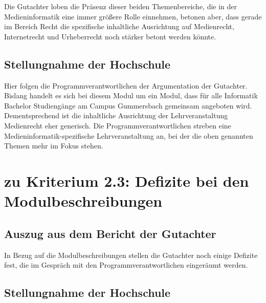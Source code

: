 \begin{siderules}
Die Gutachter loben die Präsenz dieser beiden Themenbereiche, die in der
Medieninformatik eine immer größere Rolle einnehmen, betonen aber, dass
gerade im Bereich Recht die spezifische inhaltliche Ausrichtung auf
Medienrecht, Internetrecht und Urheberrecht noch stärker betont werden
könnte.
\end{siderules}

\subsection{Stellungnahme der
Hochschule\label{/mi-2017/selbstbericht/auflagen/0000-auflagen}}\label{stellungnahme-der-hochschulepathlabelmi-2017selbstberichtauflagen0000-auflagen-1}

Hier folgen die Programmverantwortlichen der Argumentation der
Gutachter. Bislang handelt es sich bei diesem Modul um ein Modul, dass
für alle Informatik Bachelor Studiengänge am Campus Gummersbach
gemeinsam angeboten wird. Dementsprechend ist die inhaltliche
Ausrichtung der Lehrveranstaltung Medienrecht eher generisch. Die
Programmverantwortlichen streben eine Medieninformatik-spezifische
Lehrveranstaltung an, bei der die oben genannten Themen mehr im Fokus
stehen.

\section{zu Kriterium 2.3: Defizite bei den
Modulbeschreibungen\label{/mi-2017/selbstbericht/auflagen/0000-auflagen}}\label{zu-kriterium-2.3-defizite-bei-den-modulbeschreibungenpathlabelmi-2017selbstberichtauflagen0000-auflagen}

\subsection{Auszug aus dem Bericht der
Gutachter\label{/mi-2017/selbstbericht/auflagen/0000-auflagen}}\label{auszug-aus-dem-bericht-der-gutachterpathlabelmi-2017selbstberichtauflagen0000-auflagen-3}

\begin{siderules}
In Bezug auf die Modulbeschreibungen stellen die Gutachter noch einige
Defizite fest, die im Gespräch mit den Programmverantwortlichen
eingeräumt werden.
\end{siderules}

\subsection{Stellungnahme der
Hochschule\label{/mi-2017/selbstbericht/auflagen/0000-auflagen}}\label{stellungnahme-der-hochschulepathlabelmi-2017selbstberichtauflagen0000-auflagen-2}

